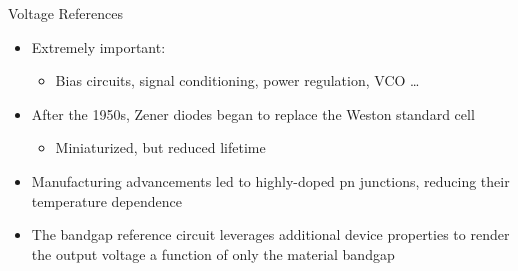 \documentclass[aspectratio=1610]{beamer} %
\begin{document}
\begin{frame}{Voltage References}
    \begin{itemize}
        \item Extremely important:
        \begin{itemize}
            \item Bias circuits, signal conditioning, power regulation, VCO \dots
        \end{itemize}
        \item After the 1950s, Zener diodes began to replace the Weston standard cell~\cite{Weston1893,Zener1934}
        \begin{itemize}
            \item Miniaturized, but reduced lifetime~\cite{Baker1960}
        \end{itemize}
        \item Manufacturing advancements led to highly-doped pn junctions, reducing their temperature dependence~\cite{Hibiber1964}
        \item The bandgap reference circuit leverages additional device properties to render the output voltage a function of only the material bandgap
    \end{itemize}


\end{frame}
\end{document}

